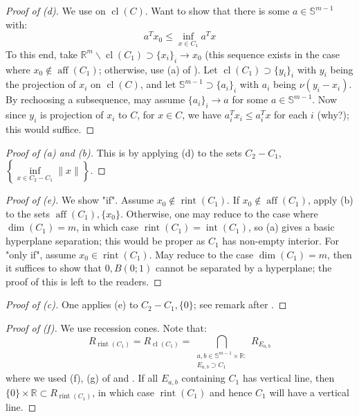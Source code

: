 \begin{proof}[Proof of (d)]
	We use  on $\operatorname{cl}(C)$. Want to show that there is some $a\in \mathbb{S}^{m-1}$ with:
	\[
		a^Tx_0\leq \underset{x\in C_1}{\operatorname{inf}}a^Tx
	\]
	To this end, take $\mathbb{R}^m\smallsetminus \operatorname{cl}(C_1)\supset \{x_i\}_i\to x_0$ (this sequence exists in the case where $x_0\notin \operatorname{aff}(C_1)$; otherwise, use (a) of ). Let $\operatorname{cl}(C_1)\supset\{y_i\}_i$ with $y_i$ being the projection of $x_i$ on $\operatorname{cl}(C)$, and let $\mathbb{S}^{m-1}\supset \{a_i\}_i$ with $a_i$ being $\nu(y_i-x_i)$. By rechoosing a subsequence, may assume $\{a_i\}_i\to a$ for some $a\in \mathbb{S}^{m-1}$. Now since $y_i$ is projection of $x_i$ to $C$, for $x\in C$, we have $a_i^Tx_i\leq a_i^Tx$ for each $i$ (why?); this would suffice.
\end{proof}
\begin{proof}[Proof of (a) and (b)]
	This is by applying (d) to the sets $C_2-C_1$, $\left\{\underset{x\in C_2-C_1}{\operatorname{inf}}\|x\|\right\}$.
\end{proof}
\begin{proof}[Proof of (e)]
	We show "if". Assume $x_0\notin \operatorname{rint}(C_1)$. If $x_0\notin \operatorname{aff}(C_1)$, apply (b) to the sets $\operatorname{aff}(C_1),\{x_0\}$. Otherwise, one may reduce to the case where $\dim(C_1)=m$, in which case $\operatorname{rint}(C_1)=\operatorname{int}(C_1)$, so (a) gives a basic hyperplane separation; this would be proper as $C_1$ has non-empty interior. For "only if", assume $x_0\in \operatorname{rint}(C_1)$. May reduce to the case $\dim(C_1)=m$, then it suffices to show that $0,B(0;1)$ cannot be separated by a hyperplane; the proof of this is left to the readers.
\end{proof}
\begin{proof}[Proof of (c)]
	One applies (e) to $C_2-C_1,\{0\}$; see remark after .
\end{proof}
\begin{proof}[Proof of (f)]
	We use recession cones. Note that:
	\[
		R_{\operatorname{rint}(C_1)}=
		R_{\operatorname{cl}(C_1)}=
		\bigcap_{\substack{a,b\in \mathbb{S}^{m-1}\times \mathbb{R}:\\E_{a,b}\supset C_1}}R_{E_{a,b}}
	\]
	where we used (f), (g) of  and . If all $E_{a,b}$ containing $C_1$ has vertical line, then $\{0\}\times\mathbb{R}\subset R_{\operatorname{rint}(C_1)}$, in which case $\operatorname{rint}(C_1)$ and hence $C_1$ will have a vertical line.
\end{proof}
